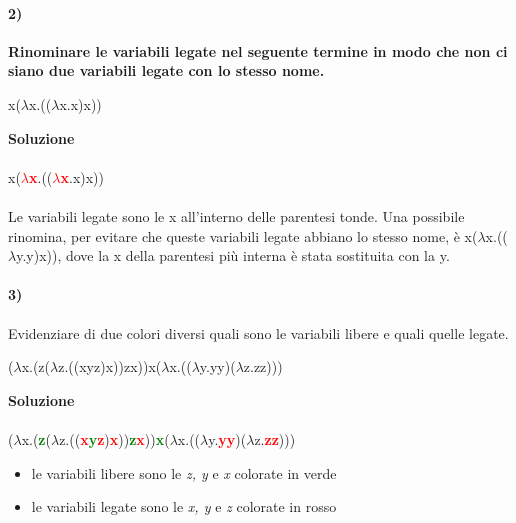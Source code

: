 \paragraph{2)}
\textbf{Rinominare le variabili legate nel seguente termine in modo che non ci siano due variabili legate con lo stesso nome.}
\begin{center}x($\lambda$x.(($\lambda$x.x)x))\end{center}
\textbf{Soluzione}\\\\
x(\textbf{\textcolor{red}{$\lambda$x}}.((\textbf{\textcolor{red}{$\lambda$x}}.x)x))\\\\
Le variabili legate sono le x all'interno delle parentesi tonde. Una possibile rinomina, per evitare che queste variabili legate abbiano lo stesso nome, \`e x($\lambda$x.(($\lambda$y.y)x)), dove la x della parentesi pi\`u interna \`e stata sostituita con la y.

\paragraph{3)}
Evidenziare di due colori diversi quali sono le variabili libere e quali quelle legate.
\begin{center}($\lambda$x.(z($\lambda$z.((xyz)x))zx))x($\lambda$x.(($\lambda$y.yy)($\lambda$z.zz)))\end{center}
\textbf{Soluzione}\\\\
($\lambda$x.(\textbf{\textcolor{green}{z}}($\lambda$z.((\textbf{\textcolor{red}{x}\textcolor{green}{y}\textcolor{red}{z}})\textbf{\textcolor{red}{x}}))\textbf{\textcolor{green}{z}\textcolor{red}{x}}))\textbf{\textcolor{green}{x}}($\lambda$x.(($\lambda$y.\textbf{\textcolor{red}{yy}})($\lambda$z.\textbf{\textcolor{red}{zz}})))
\begin{itemize}
\item le variabili libere sono le \textit{z, y} e \textit{x} colorate in verde
\item le variabili legate sono le \textit{x, y} e \textit{z} colorate in rosso
\end{itemize}

